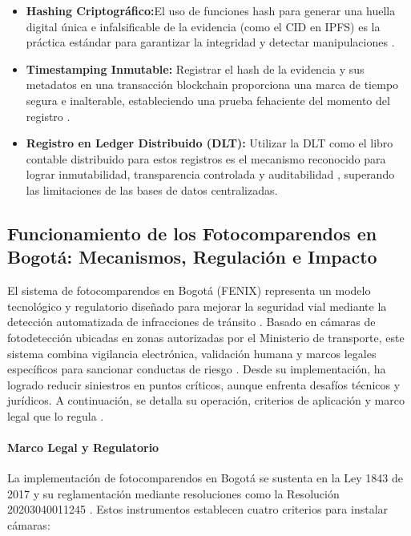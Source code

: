 \begin{itemize}
    \item \textbf{Hashing Criptográfico:}El uso de funciones hash para generar una huella digital única e infalsificable de la evidencia (como el CID en IPFS) es la práctica estándar para garantizar la integridad y detectar manipulaciones \parencite{benet2014ipfs}. 
    \item \textbf{Timestamping Inmutable:} Registrar el hash de la evidencia y sus metadatos en una transacción blockchain proporciona una marca de tiempo segura e inalterable, estableciendo una prueba fehaciente del momento del registro \parencite{nakamoto2008bitcoin}. 
    \item \textbf{Registro en Ledger Distribuido (DLT):} Utilizar la DLT como el libro contable distribuido para estos registros es el mecanismo reconocido para lograr inmutabilidad, transparencia controlada y auditabilidad \parencite{swan2015blockchain}, superando las limitaciones de las bases de datos centralizadas.
\end{itemize}

\subsection{Funcionamiento de los Fotocomparendos en Bogotá: Mecanismos, Regulación e Impacto} 
El sistema de fotocomparendos en Bogotá (FENIX) representa un modelo tecnológico y regulatorio diseñado para mejorar la seguridad vial mediante la detección automatizada de infracciones de tránsito \parencite{mintransporte2023}. Basado en cámaras de fotodetección ubicadas en zonas autorizadas por el Ministerio de transporte, este sistema combina vigilancia electrónica, validación humana y marcos legales específicos para sancionar conductas de riesgo \parencite{supertransporte2021}. Desde su implementación, ha logrado reducir siniestros en puntos críticos, aunque enfrenta desafíos técnicos y jurídicos. A continuación, se detalla su operación, criterios de aplicación y marco legal que lo regula \parencite{mintransporte2023}.

\paragraph{Marco Legal y Regulatorio} La implementación de fotocomparendos en Bogotá se sustenta en la Ley 1843 de 2017 \parencite{ley1843} y su reglamentación mediante resoluciones como la Resolución 20203040011245 \parencite{resolucion11245}. Estos instrumentos establecen cuatro criterios para instalar cámaras: 

